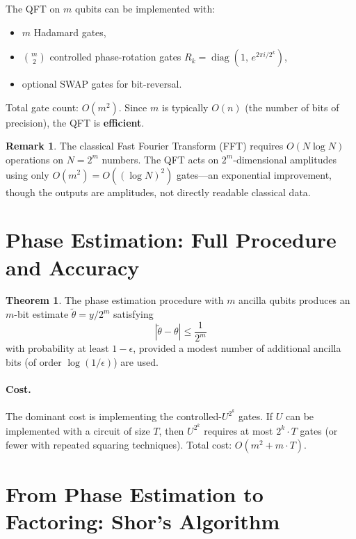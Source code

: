 \documentclass[11pt]{article}
\theoremstyle{definition}
\newtheorem{remark}{Remark}[section]
\newtheorem{theorem}{Theorem}[section]
\begin{document}
The QFT on $m$ qubits can be implemented with:
\begin{itemize}
    \item $m$ Hadamard gates,
    \item $\binom{m}{2}$ controlled phase-rotation gates $R_k = \operatorname{diag}(1,\,e^{2\pi i/2^k})$,
    \item optional SWAP gates for bit-reversal.
\end{itemize}

Total gate count: $O(m^2)$.  Since $m$ is typically $O(n)$ (the number of bits of precision), the QFT is \textbf{efficient}.

\begin{remark}
The classical Fast Fourier Transform (FFT) requires $O(N\log N)$ operations on $N=2^m$ numbers.  The QFT acts on $2^m$-dimensional amplitudes using only $O(m^2)=O((\log N)^2)$ gates---an exponential improvement, though the outputs are amplitudes, not directly readable classical data.
\end{remark}

\section{Phase Estimation: Full Procedure and Accuracy}

\begin{theorem}
The phase estimation procedure with $m$ ancilla qubits produces an $m$-bit estimate $\tilde\theta = y/2^m$ satisfying
\[
    |\tilde\theta - \theta| \le \frac{1}{2^m}
\]
with probability at least $1-\epsilon$, provided a modest number of additional ancilla bits (of order $\log(1/\epsilon)$) are used.
\end{theorem}

\paragraph{Cost.}  The dominant cost is implementing the controlled-$U^{2^k}$ gates.  If $U$ can be implemented with a circuit of size $T$, then $U^{2^k}$ requires at most $2^k\cdot T$ gates (or fewer with repeated squaring techniques).  Total cost: $O(m^2 + m\cdot T)$.

\section{From Phase Estimation to Factoring: Shor's Algorithm}
\end{document}

